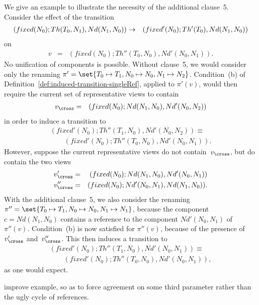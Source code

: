 We give an example to illustrate the necessity of the additional clause~5.
Consider the effect of the transition
\begin{eqnarray*}
(fixed(N_0); Th(T_0,N_1), Nd(N_1,N_0)) & \stackrel{}\rightarrow &
 (fixed'(N_0); Th'(T_0), Nd(N_1,N_0))
\end{eqnarray*}
on
\begin{eqnarray*}
v & = & (fixed(N_0); Th''(T_0,N_0), Nd'(N_0,N_1)).
\end{eqnarray*}
%
No unification of components is possible.  Without clause~5, we would consider
only the renaming $\pi' = \set{T_0 \mapsto T_1, N_0 \mapsto N_0,\linebreak[1]
  {N_1 \mapsto N_2}}$.  Condition~(b) of
Definition~\ref{def:induced-transition-singleRef}, applied to $\pi'(v)$, would
then require the current set of representative views to contain
%
\begin{eqnarray*}
v_\cross & = & (fixed(N_0); Nd(N_1,N_0), Nd'(N_0,N_2))
\end{eqnarray*}
in order to induce a transition to
\[
\begin{align}
(fixed'(N_0); Th''(T_1,N_0),  Nd'(N_0,N_2)) \equiv \\
\qquad  (fixed'(N_0); Th''(T_0,N_0), Nd'(N_0,N_1)).
\end{align}
\]
However, suppose the current representative views do not contain~$v_\cross$,
but do contain the two views
\begin{eqnarray*}
v_\cross' & = & (fixed(N_0); Nd(N_1,N_0), Nd'(N_0,N_1)) \\
v_\cross'' & = & (fixed(N_0); Nd'(N_0,N_1), Nd(N_1,N_0)).
\end{eqnarray*}
%
With the additional clause~5, we also consider the renaming $\pi'' =
\set{{T_0 \mapsto T_1}, \linebreak[1] N_0 \mapsto N_0,\linebreak[1] {N_1
    \mapsto N_1}}$, because the component $c = Nd(N_1,N_0)$ contains a
reference to the component $Nd'(N_0,N_1)$ of~$\pi''(v)$.  Condition~(b) is now
satisfied for $\pi''(v)$, because of the presence of~$v_\cross'$
and~$v_\cross''$.  This then induces a transition to
\[
\begin{align}
(fixed'(N_0); Th''(T_1,N_0), Nd'(N_0,N_1)) \equiv \\
\qquad (fixed'(N_0); Th''(T_0,N_0), Nd'(N_0,N_1)),
\end{align}
\]
as one would expect.

 improve example, so as to force agreement on some third
parameter rather than the ugly cycle of references. 

